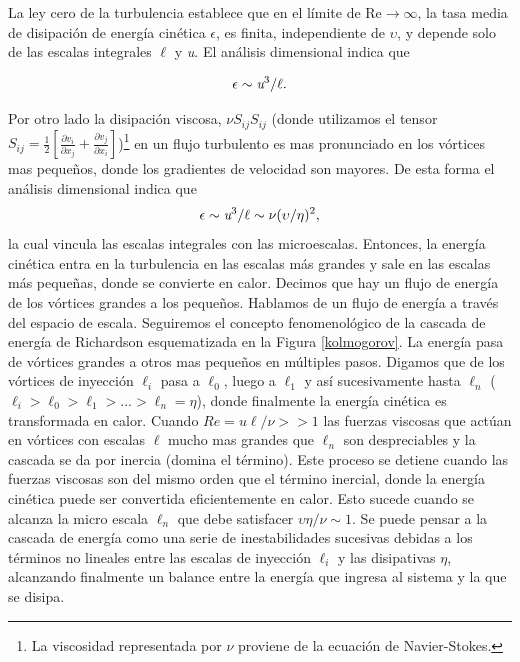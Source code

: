 \documentclass[a4paper,11pt]{report}
\begin{document}
La ley cero de la turbulencia establece que en el límite de Re$\rightarrow \infty$, la tasa media de disipación de energía cinética $\epsilon$, es finita, independiente de $\upsilon$, y depende solo de las escalas integrales $\ell$ y \emph{u}. El análisis dimensional indica que

\begin{equation}
  \epsilon \sim \emph{u}^3 / \ell.
\end{equation}

Por otro lado la disipación viscosa, $\nu S_{ij}S_{ij}$ (donde utilizamos el tensor $S_{ij}=\frac{1}{2}[\frac{\partial v_i}{\partial x_j}+\frac{\partial v_j}{\partial x_i}]$)\footnote{La viscosidad representada por $\nu$ proviene de la ecuación de Navier-Stokes.} en un flujo turbulento es mas pronunciado en los vórtices mas pequeños, donde los gradientes de velocidad son mayores. De esta forma el análisis dimensional indica que
\begin{equation}
  \epsilon \sim \emph{u}^3 / \ell \sim \nu(\upsilon/\eta)^2,
\end{equation}
la cual vincula las escalas integrales con las microescalas.
Entonces, la energía cinética entra en la turbulencia en las escalas más grandes y sale en las escalas más pequeñas, donde se convierte en calor. Decimos que hay un flujo de energía de los vórtices grandes a los pequeños. Hablamos de un flujo de energía a través del espacio de escala. Seguiremos el concepto fenomenológico de la cascada de energía de Richardson esquematizada en la Figura \ref{kolmogorov}. La energía pasa de vórtices grandes a otros mas pequeños en múltiples pasos. Digamos que de los vórtices de inyección $\ell_i$ pasa a $\ell_0$, luego a $\ell_1$ y así sucesivamente hasta $\ell_n$ ($\ell_i>\ell_0>\ell_1>...>\ell_n=\eta$), donde finalmente la energía cinética es transformada en calor.
Cuando $Re=u\ell/\nu >>1$ las fuerzas viscosas que actúan en vórtices con escalas $\ell$ mucho mas grandes que $\ell_n$ son despreciables y la cascada se da por inercia (domina el término). Este proceso se detiene cuando las fuerzas viscosas son del mismo orden que el término inercial, donde la energía cinética puede ser convertida eficientemente en calor. Esto sucede cuando se alcanza la micro escala $\ell_n$ que debe satisfacer $\upsilon \eta/ \nu \sim 1$. Se puede pensar a la cascada de energía como una serie de inestabilidades sucesivas debidas a los términos no lineales entre las escalas de inyección $\ell_i$ y las disipativas $\eta$, alcanzando finalmente un balance entre la energía que ingresa al sistema y la que se disipa.
\end{document}
